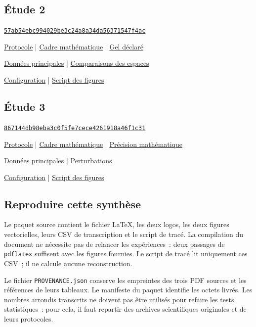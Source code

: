 \documentclass[11pt,a4paper]{article}
\newcommand{\repo}{https://github.com/halhoulmhamed-droid/inverse-laplace-learning}
\newcommand{\shatwo}{57ab54ebc994029be3c24a8a34da56371547f4ac}
\newcommand{\shathree}{867144db98eba3c0f5fe7cece4261918a46f1c31}
\newcommand{\gitlink}[3]{\href{\repo/blob/#1/#2}{#3}}
\begin{document}
\subsection*{Étude 2}
\href{\repo/tree/\shatwo}{\texttt{\shatwo}}\par
\gitlink{\shatwo}{studies/study2/PROTOCOL.md}{Protocole} \enspace | \enspace
\gitlink{\shatwo}{studies/study2/MATHEMATICS.md}{Cadre mathématique} \enspace | \enspace
\gitlink{\shatwo}{studies/study2/FREEZE.json}{Gel déclaré}\par
\gitlink{\shatwo}{studies/study2/figures/primary.npz}{Données principales} \enspace | \enspace
\gitlink{\shatwo}{studies/study2/figures/projection.npz}{Comparaisons des espaces}\par
\gitlink{\shatwo}{studies/study2/results/final/configuration.json}{Configuration} \enspace | \enspace
\gitlink{\shatwo}{studies/study2/src/figures.py}{Script des figures}

\subsection*{Étude 3}
\href{\repo/tree/\shathree}{\texttt{\shathree}}\par
\gitlink{\shathree}{studies/study3/PROTOCOL.md}{Protocole} \enspace | \enspace
\gitlink{\shathree}{studies/study3/MATHEMATICS.md}{Cadre mathématique} \enspace | \enspace
\gitlink{\shathree}{studies/study3/MATHEMATICS_ADDENDUM.md}{Précision mathématique}\par
\gitlink{\shathree}{studies/study3/figures/primary.npz}{Données principales} \enspace | \enspace
\gitlink{\shathree}{studies/study3/figures/robustness.npz}{Perturbations}\par
\gitlink{\shathree}{studies/study3/results/final/configuration.json}{Configuration} \enspace | \enspace
\gitlink{\shathree}{studies/study3/src/figures.py}{Script des figures}

\subsection*{Reproduire cette synthèse}
Le paquet source contient le fichier LaTeX, les deux logos, les deux figures vectorielles,
leurs CSV de transcription et le script de tracé. La compilation du document ne nécessite
pas de relancer les expériences~: deux passages de \texttt{pdflatex} suffisent avec les figures
fournies. Le script de tracé lit uniquement ces CSV~; il ne calcule aucune reconstruction.

Le fichier \texttt{PROVENANCE.json} conserve les empreintes des trois PDF sources et les
références de leurs tableaux. Le manifeste du paquet identifie les octets livrés. Les nombres
arrondis transcrits ne doivent pas être utilisés pour refaire les tests statistiques~: pour cela,
il faut repartir des archives scientifiques originales et de leurs protocoles.
\end{document}
